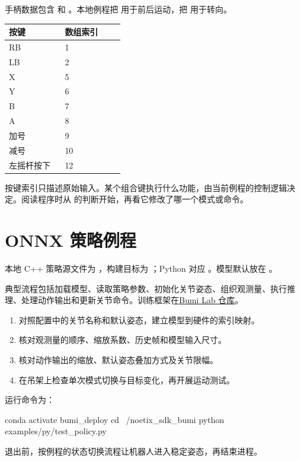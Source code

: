 手柄数据包含  和 。本地例程把  用于前后运动，把  用于转向。

\begingroup\small\renewcommand{\arraystretch}{1.15}
\begin{longtable}{@{}P{0.43\linewidth}P{0.46\linewidth}@{}}
\toprule
\textbf{按键} & \textbf{数组索引} \\
\midrule\endhead
RB & 1 \\
LB & 2 \\
X & 5 \\
Y & 6 \\
B & 7 \\
A & 8 \\
加号 & 9 \\
减号 & 10 \\
左摇杆按下 & 12 \\
\bottomrule\end{longtable}\endgroup

按键索引只描述原始输入。某个组合键执行什么功能，由当前例程的控制逻辑决定。阅读程序时从  的判断开始，再看它修改了哪一个模式或命令。
\section{ONNX 策略例程}
本地 C++ 策略源文件为 ，构建目标为 ；Python 对应 。模型默认放在 。

典型流程包括加载模型、读取策略参数、初始化关节姿态、组织观测量、执行推理、处理动作输出和更新关节命令。训练框架在\href{https://github.com/Noetix-Robotics/noetix_bumi_lab}{Bumi Lab 仓库}。
\begin{enumerate}
\item 对照配置中的关节名称和默认姿态，建立模型到硬件的索引映射。
\item 核对观测量的顺序、缩放系数、历史帧和模型输入尺寸。
\item 核对动作输出的缩放、默认姿态叠加方式及关节限幅。
\item 在吊架上检查单次模式切换与目标变化，再开展运动测试。
\end{enumerate}
运行命令为：
\par\noindent\begin{minipage}{\linewidth}
\begin{command}
conda activate bumi_deploy
cd ~/noetix_sdk_bumi
python examples/py/test_policy.py
\end{command}
\end{minipage}\par

退出前，按例程的状态切换流程让机器人进入稳定姿态，再结束进程。
